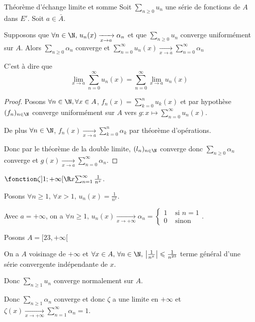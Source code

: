 \begin{theoreme}{Théorème d'échange limite et somme}{}
    Soit $\sum_{n \geqslant 0 } u_n$ une série de fonctions de $A$ dans $E'$. Soit $a \in \bar A$. 

    Supposons que $\forall n \in \N, \, u_n(x) \xrightarrow[x \to a]{} \alpha_n$ et que 
    $\sum_{n \geqslant 0} u_n$ converge uniformément sur $A$. Alors 
    $\displaystyle \sum_{n \geqslant 0} \alpha_n$ converge et 
    $ \displaystyle \sum_{n = 0 }^{\infty    } u_n(x) \xrightarrow[x \to a]{} \sum_{n = 0}^{\infty} \alpha_n$

    C'est à dire que 
    $$\lim_{x \to a} \sum_{n = 0}^{\infty} u_n(x) = \sum_{n = 0}^{\infty} \lim_{x \to a} u_n(x)$$
\end{theoreme}


\begin{proof}
    Posons $\forall n \in \N, \forall x \in A$, $\displaystyle f_n(x) = \sum_{k = 0}^n u_k(x)$ et par hypothèse 
    $(f_n)_{n \in \N}$ converge uniformément sur $A$ vers $\displaystyle g : x \mapsto \sum_{n = 0}^{\infty} u_n(x)$.

    De plus $\displaystyle \forall n \in \N$, $\displaystyle f_n(x) \xrightarrow[x \to a]{} \sum_{k = 0}^n \alpha_k$ par théorème d'opérations. 

    Donc par le théorème de la double limite, $(l_n)_{n \in \N}$ converge donc $\displaystyle \sum_{n \geqslant 0} \alpha_n$ converge et 
    $\displaystyle g(x) \xrightarrow[x \to a]{} \sum_{n = 0}^{\infty} \alpha_n$.
\end{proof}

\begin{exemple}
    $\fonction \zeta{]1; +\infty[}{\R}{x}{\sum_{n = 1}^{\infty} \frac 1 {n^x}}$.

    Posons $\forall n \geqslant 1, \, \forall x > 1, \, u_n(x) = \frac 1 {n^x}$.

    Avec $a = + \infty$, on a $\forall n \geqslant 1, \, u_n(x) \xrightarrow[x \to +\infty]{} \alpha_n = \left\{\begin{array}{cc} 1 & \text{ si } n = 1 \\ 0 & \text{ sinon } \end{array} \right.$.
        
    Posons $A = [23, + \infty[$

    On a $A$ voisinage de $+ \infty$ et $\forall x \in A, \, \forall n \in \N, \, \left| \frac{1}{n^x} \right| \leqslant \frac 1 {n^{23}}$ 
    terme général d'une série convergente indépendante de $x$.

    Donc $\displaystyle \sum_{n \geqslant 1} u_n$ converge normalement sur $A$. 

    Donc $\displaystyle \sum_{n \geqslant 1} \alpha_n$ converge et donc $\zeta$ a une limite en $+ \infty$ et 
    $\zeta(x) \xrightarrow[x \to +\infty]{} \sum_{n = 1 }^{\infty } \alpha_n = 1$.

\end{exemple}

